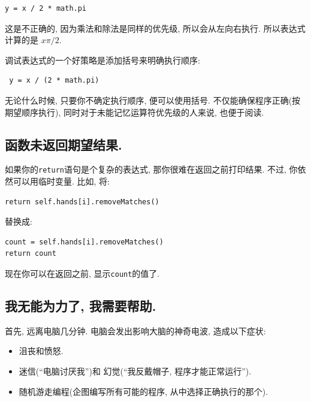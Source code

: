 \documentclass[10pt]{book}
\begin{document}
\begin{verbatim}
y = x / 2 * math.pi
\end{verbatim}
%
这是不正确的, 因为乘法和除法是同样的优先级, 所以会从左向右执行. 
所以表达式计算的是 $x \pi / 2$.

调试表达式的一个好策略是添加括号来明确执行顺序:

\begin{verbatim}
 y = x / (2 * math.pi)
\end{verbatim}
%
无论什么时候, 只要你不确定执行顺序, 便可以使用括号. 
不仅能确保程序正确(按期望顺序执行), 同时对于未能记忆运算符优先级的人来说, 
也便于阅读. 


\subsection{函数未返回期望结果.}

如果你的{\tt return}语句是个复杂的表达式, 
那你很难在返回之前打印结果. 
不过, 你依然可以用临时变量. 
比如, 将:

\begin{verbatim}
return self.hands[i].removeMatches()
\end{verbatim}
%
替换成:

\begin{verbatim}
count = self.hands[i].removeMatches()
return count
\end{verbatim}
%
现在你可以在返回之前, 显示{\tt count}的值了.


\subsection{我无能为力了, 我需要帮助.}

首先, 远离电脑几分钟. 
电脑会发出影响大脑的神奇电波, 造成以下症状:

\begin{itemize}

\item 沮丧和愤怒.

\item 迷信(``电脑讨厌我'')和
幻觉(``我反戴帽子, 程序才能正常运行'').

\item 随机游走编程(企图编写所有可能的程序, 从中选择正确执行的那个).

\end{itemize}
\end{document}
